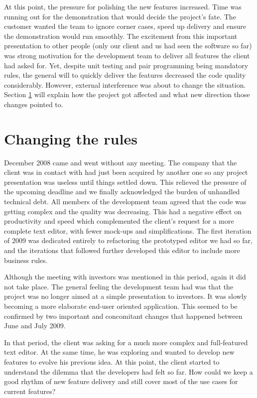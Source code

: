 \documentclass[lnbip]{svmultln}
\begin{document}
At this point, the pressure for polishing the new features
increased. Time was running out for the demonstration that would
decide the project's fate. The customer wanted the team to ignore
corner cases, speed up delivery and ensure the demonstration would run
smoothly. The excitement from this important presentation to other
people (only our client and us had seen the software so far) was
strong motivation for the development team to deliver all features the
client had asked for. Yet, despite unit testing and pair programming
being mandatory rules, the general will to quickly deliver the
features decreased the code quality considerably. However, external
interference was about to change the situation. Section
\ref{sec:changes} will explain how the project got affected and what
new direction those changes pointed to.

\section{Changing the rules}
\label{sec:changes}

December 2008 came and went without any meeting. The company that the
client was in contact with had just been acquired by another one so
any project presentation was useless until things settled down. This
relieved the pressure of the upcoming deadline and we finally
acknowledged the burden of unhandled technical debt. All members of
the development team agreed that the code was getting complex and the
quality was decreasing. This had a negative effect on productivity and
speed which complemented the client's request for a more complete text
editor, with fewer mock-ups and simplifications. The first iteration
of 2009 was dedicated entirely to refactoring the prototyped editor we
had so far, and the iterations that followed further developed this
editor to include more business rules.

Although the meeting with investors was mentioned in this period,
again it did not take place. The general feeling the development team
had was that the project was no longer aimed at a simple presentation
to investors. It was slowly becoming a more elaborate end-user
oriented application. This seemed to be confirmed by two important and
concomitant changes that happened between June and July 2009.

In that period, the client was asking for a much more complex and
full-featured text editor. At the same time, he was exploring and
wanted to develop new features to evolve his previous idea. At this
point, the client started to understand the dilemma that the
developers had felt so far.  How could we keep a good rhythm of new
feature delivery and still cover most of the use cases for current
features?
\end{document}
